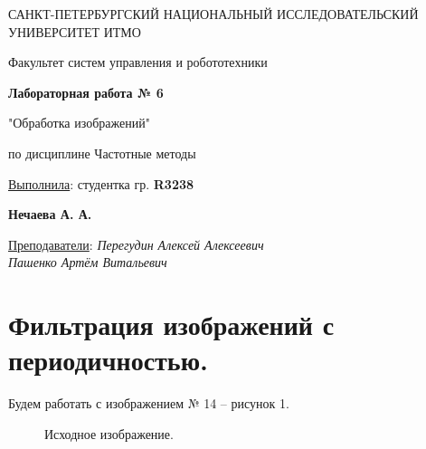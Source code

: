 \documentclass[a5paper, 10pt]{article}
\theoremstyle{definition}
\theoremstyle{plain}
\theoremstyle{remark}
\newcommand*{\titlePage}{
	\thispagestyle{title}
	\begingroup
	\begin{center}
		\vspace*{6ex}
		
		{\small
			САНКТ-ПЕТЕРБУРГСКИЙ НАЦИОНАЛЬНЫЙ ИССЛЕДОВАТЕЛЬСКИЙ УНИВЕРСИТЕТ ИТМО	
		}
		
		\vspace*{2ex}
		
		{\normalsize
			Факультет систем управления и робототехники
		}
		
		\vspace*{15ex}
		
		{\Large \bfseries 
			Лабораторная работа № 6
		}
\vspace*{2ex}
	{\Large \bfseries 
			
"Обработка изображений"
		}
\vspace*{2ex}
		
		{\normalsize
			по дисциплине Частотные методы
		}

	\end{center}
	\vspace*{20ex}
	\begin{flushright}
		{\large 
			\underline{Выполнила}: студентка гр. \textbf{R3238}\\
			\begin{flushright}
				\textbf{Нечаева А. А.}\\
			\end{flushright}
		}
		
		\vspace*{5ex}
		
		{\large 
			\underline{Преподаватели}: \textit{Перегудин Алексей Алексеевич} \\ \textit{Пашенко Артём Витальевич}
		}
	\end{flushright}	
	\newpage
	\setcounter{page}{1}
	\endgroup}
\begin{document}
	\titlePage
	\pagestyle{style}
\newpage

\section{Фильтрация изображений с периодичностью.}

Будем работать с изображением № 14 -- рисунок 1.

\begin{figure}[h!]
\caption{Исходное изображение.}
\end{figure}
\end{document}
